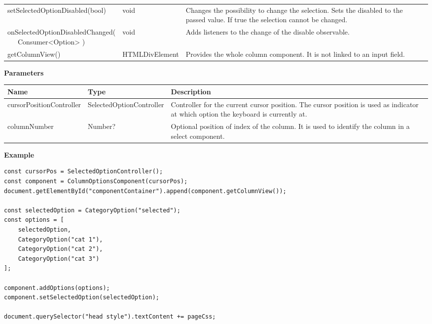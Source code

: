 \begin{table}[!htb]
\begin{tabular}{ p{5cm} p{3cm} p{5cm} }
        setSelectedOptionDisabled(bool)     & void           & Changes the possibility to change the selection. 
                                                               Sets the disabled to the passed value. 
                                                               If true the selection cannot be changed. \\
        \tbbr{
            onSelectedOptionDisabledChanged( \\
                \ \ \ Consumer<Option>
            )}                              & void           & Adds listeners to the change of the disable observable. \\
        getColumnView()                     & HTMLDivElement & Provides the whole column component. 
                                                               It is not linked to an input field. \\
        \bottomrule[1.2pt]
    \end{tabular}
\end{table}

\vspace*{6pt}
\noindent
\textbf{Parameters}

\begin{table}[!htb] 
    \label{api:columnOptionsComponentParameter}
    \footnotesize
    \setlength\extrarowheight{4pt}
    \begin{tabular}{ p{3.2cm} p{4.2cm} p{5.6cm} }
        \toprule[1.2pt]
        \textbf{Name}            & \textbf{Type}            & \textbf{Description} \\
        \midrule
        cursorPositionController & SelectedOptionController & Controller for the current cursor position. 
                                                              The cursor position is used as indicator at which option the keyboard is currently at. \\
        columnNumber             & Number?                  & Optional position of index of the column. 
                                                              It is used to identify the column in a select component. \\
        \bottomrule[1.2pt]
    \end{tabular}
\end{table}

\vspace*{6pt}
\noindent
\textbf{Example}

\begin{lstlisting}[style = htmlcssjs, label = api:columnOptionsComponentExample]
const cursorPos = SelectedOptionController();
const component = ColumnOptionsComponent(cursorPos);
document.getElementById("componentContainer").append(component.getColumnView());

const selectedOption = CategoryOption("selected");
const options = [ 
    selectedOption,
    CategoryOption("cat 1"),
    CategoryOption("cat 2"),
    CategoryOption("cat 3") 
];

component.addOptions(options);
component.setSelectedOption(selectedOption);

document.querySelector("head style").textContent += pageCss;
\end{lstlisting}

